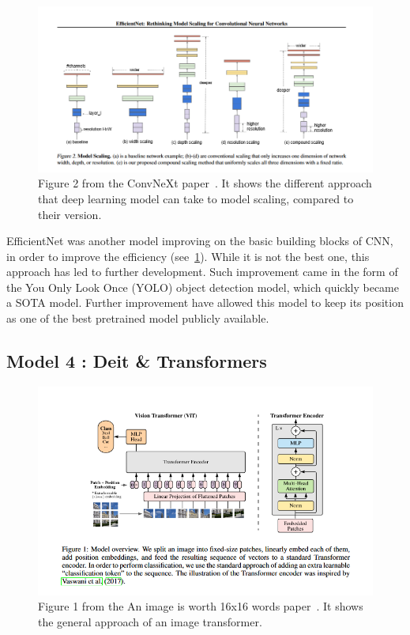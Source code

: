 \documentclass[11pt]{article}
\begin{document}
\begin{figure}[H]

     \centering
     \includegraphics[width=0.8 \textwidth]{plots/efficientnet}
     \caption{Figure 2 from the ConvNeXt paper~\cite{efficientnet}. It shows the different approach that deep learning
     model can take to model scaling, compared to their version.}
     \label{fig:efficientnet}

\end{figure}

    EfficientNet was another model improving on the basic building blocks of CNN, in order to improve the efficiency (see~\ref{fig:efficientnet}). While it is
    not the best one, this approach has led to further development. Such improvement came in the form of the You Only Look Once (YOLO) object detection
    model, which quickly became a SOTA model. Further improvement have allowed this model to keep its position as one of the best pretrained model publicly available.

    \subsection{Model 4 : Deit \& Transformers~\cite{deit}~\cite{image16x16}}


        \begin{figure}[H]

             \centering
             \includegraphics[width=0.8 \textwidth]{plots/transformer}
             \caption{Figure 1 from the An image is worth 16x16 words paper~\cite{image16x16}. It shows the general approach of an image transformer.}
             \label{fig:transformer}

        \end{figure}
\end{document}
